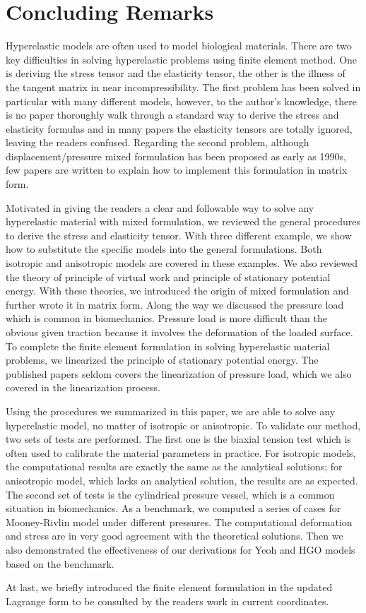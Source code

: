 \section{Concluding Remarks}
Hyperelastic models are often used to model biological materials. There are two key difficulties in solving hyperelastic problems using finite element method. One is deriving the stress tensor and the elasticity tensor, the other is the illness of the tangent matrix in near incompressibility. The first problem has been solved in particular with many different models, however, to the author's knowledge, there is no paper thoroughly walk through a standard way to derive the stress and elasticity formulas and in many papers the elasticity tensors are totally ignored, leaving the readers confused. Regarding the second problem, although displacement/pressure mixed formulation has been proposed as early as 1990s, few papers are written to explain how to implement this formulation in matrix form. 

Motivated in giving the readers a clear and followable way to solve any hyperelastic material with mixed formulation, we reviewed the general procedures to derive the stress and elasticity tensor. With three different example, we show how to substitute the specific models into the general formulations. Both isotropic and anisotropic models are covered in these examples. We also reviewed the theory of principle of virtual work and principle of stationary potential energy. With these theories, we introduced the origin of mixed formulation and further wrote it in matrix form. Along the way we discussed the pressure load which is common in biomechanics. Pressure load is more difficult than the obvious given traction because it involves the deformation of the loaded surface. To complete the finite element formulation in solving hyperelastic material problems, we linearized the principle of stationary potential energy. The published papers seldom covers the linearization of pressure load, which we also covered in the linearization process. 

Using the procedures we summarized in this paper, we are able to solve any hyperelastic model, no matter of isotropic or anisotropic. To validate our method, two sets of tests are performed. The first one is the biaxial tension test which is often used to calibrate the material parameters in practice. For isotropic models, the computational results are exactly the same as 
the analytical solutions; for anisotropic model, which lacks an analytical solution, the results are as expected. The second set of tests is the cylindrical pressure vessel, which is a common situation in biomechanics. As a benchmark, we computed a series of cases for Mooney-Rivlin model under different pressures. The computational deformation and stress are in very good agreement with the theoretical solutions. Then we also demonstrated the effectiveness of our derivations for Yeoh and HGO models based on the benchmark. 

At last, we briefly introduced the finite element formulation in the updated Lagrange form to be consulted by the readers work in current coordinates.   
